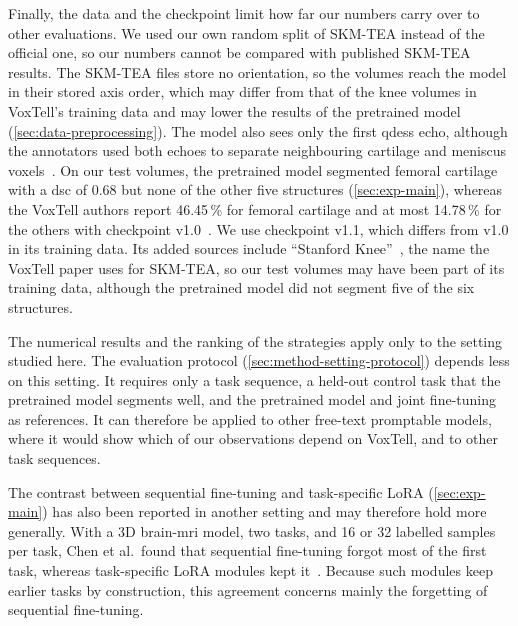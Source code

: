 Finally, the data and the checkpoint limit how far our numbers carry over to other evaluations.
We used our own random split of SKM-TEA instead of the official one, so our numbers cannot be compared with published SKM-TEA results.
The SKM-TEA files store no orientation, so the volumes reach the model in their stored axis order, which may differ from that of the knee volumes in VoxTell's training data and may lower the results of the pretrained model (\cref{sec:data-preprocessing}).
The model also sees only the first \gls{qdess} echo, although the annotators used both echoes to separate neighbouring cartilage and meniscus voxels~\cite[App.~A.4]{desai2021skmtea}.
On our test volumes, the pretrained model segmented femoral cartilage with a \gls{dsc} of 0.68 but none of the other five structures (\cref{sec:exp-main}), whereas the VoxTell authors report 46.45\,\% for femoral cartilage and at most 14.78\,\% for the others with checkpoint v1.0~\cites[Suppl.~Table~9]{rokuss2025voxtellfreetextpromptableuniversal}{rokuss2026voxtellmodelcard}.
We use checkpoint v1.1, which differs from v1.0 in its training data.
Its added sources include ``Stanford Knee''~\cite{rokuss2026voxtellissue15}, the name the VoxTell paper uses for SKM-TEA, so our test volumes may have been part of its training data, although the pretrained model did not segment five of the six structures.

The numerical results and the ranking of the strategies apply only to the setting studied here.
The evaluation protocol (\cref{sec:method-setting-protocol}) depends less on this setting.
It requires only a task sequence, a held-out control task that the pretrained model segments well, and the pretrained model and joint fine-tuning as references.
It can therefore be applied to other free-text promptable models, where it would show which of our observations depend on VoxTell, and to other task sequences.

The contrast between sequential fine-tuning and task-specific LoRA (\cref{sec:exp-main}) has also been reported in another setting and may therefore hold more generally.
With a 3D brain-\gls{mri} model, two tasks, and 16 or 32 labelled samples per task, Chen et al.\ found that sequential fine-tuning forgot most of the first task, whereas task-specific LoRA modules kept it~\cite{chen2026fewshotcontinuallearning3d}.
Because such modules keep earlier tasks by construction, this agreement concerns mainly the forgetting of sequential fine-tuning.
